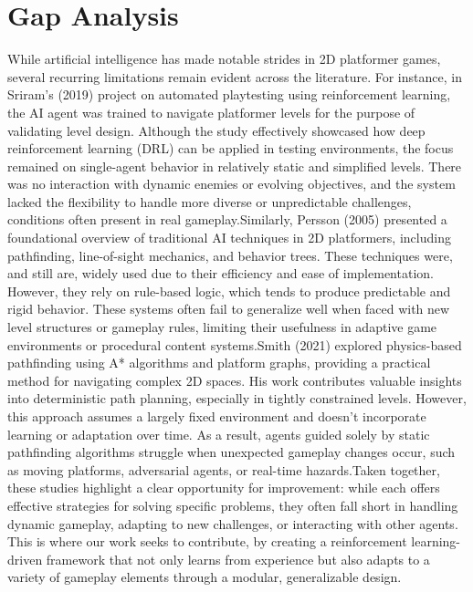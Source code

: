 \documentclass[12pt,oneside,openright,a4paper]{cpe-english-project}
\begin{document}
\section{Gap Analysis}
While artificial intelligence has made notable strides in 2D platformer games, several recurring limitations remain evident across the literature. For instance, in Sriram’s (2019) project on automated playtesting using reinforcement learning, the AI agent was trained to navigate platformer levels for the purpose of validating level design. Although the study effectively showcased how deep reinforcement learning (DRL) can be applied in testing environments, the focus remained on single-agent behavior in relatively static and simplified levels. There was no interaction with dynamic enemies or evolving objectives, and the system lacked the flexibility to handle more diverse or unpredictable challenges, conditions often present in real gameplay.Similarly, Persson (2005) presented a foundational overview of traditional AI techniques in 2D platformers, including pathfinding, line-of-sight mechanics, and behavior trees. These techniques were, and still are, widely used due to their efficiency and ease of implementation. However, they rely on rule-based logic, which tends to produce predictable and rigid behavior. These systems often fail to generalize well when faced with new level structures or gameplay rules, limiting their usefulness in adaptive game environments or procedural content systems.Smith (2021) explored physics-based pathfinding using A* algorithms and platform graphs, providing a practical method for navigating complex 2D spaces. His work contributes valuable insights into deterministic path planning, especially in tightly constrained levels. However, this approach assumes a largely fixed environment and doesn’t incorporate learning or adaptation over time. As a result, agents guided solely by static pathfinding algorithms struggle when unexpected gameplay changes occur, such as moving platforms, adversarial agents, or real-time hazards.Taken together, these studies highlight a clear opportunity for improvement: while each offers effective strategies for solving specific problems, they often fall short in handling dynamic gameplay, adapting to new challenges, or interacting with other agents. This is where our work seeks to contribute, by creating a reinforcement learning-driven framework that not only learns from experience but also adapts to a variety of gameplay elements through a modular, generalizable design.
\end{document}
